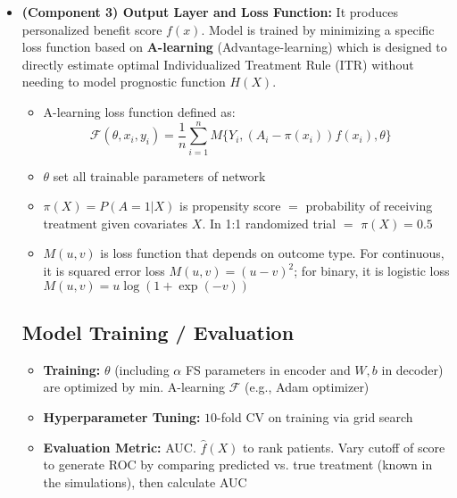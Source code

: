 \documentclass[../main.tex]{subfiles}
\begin{document}
\begin{itemize}
    \item \textbf{(Component 3) Output Layer and Loss Function:} It produces personalized benefit score $f(x)$. Model is trained by minimizing a specific loss function based on \textbf{A-learning} (Advantage-learning) which is designed to directly estimate optimal Individualized Treatment Rule (ITR) without needing to model prognostic function $H(X)$.
    \begin{itemize}
        \item A-learning loss function defined as:
        \[
        \mathcal{F}(\theta, x_i, y_i) = \frac{1}{n} \sum_{i=1}^{n} M\{Y_i, (A_i - \pi(x_i))f(x_i), \theta\} \quad 
        \]
        \item $\theta$ set all trainable parameters of network
        \item $\pi(X) = P(A=1|X)$ is propensity score $=$ probability of receiving treatment given covariates $X$. In 1:1 randomized trial $=$ $\pi(X) = 0.5$
        \item $M(u,v)$ is loss function that depends on outcome type. For continuous, it is squared error loss $M(u,v) = (u-v)^2$; for binary, it is logistic loss $M(u,v) = u \log(1+\exp(-v))$
    \end{itemize}

\subsection*{Model Training / Evaluation}
\begin{itemize}
    \item \textbf{Training:} $\theta$ (including $\alpha$ FS parameters in encoder and $W, b$ in decoder) are optimized by min. A-learning $\mathcal{F}$ (e.g., Adam optimizer)
    \item \textbf{Hyperparameter Tuning:} $10$-fold CV on training via grid search
    \item \textbf{Evaluation Metric:} AUC. $\hat{f}(X)$ to rank patients. Vary cutoff of score to generate ROC by comparing predicted vs. true treatment (known in the simulations), then calculate AUC
\end{itemize}

\end{itemize}

\end{document}
